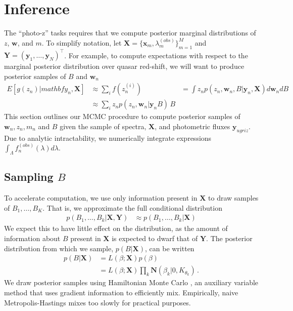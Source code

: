 \documentclass{article}
\newcommand{\trans}{\intercal}
\begin{document}
\section{Inference}
\label{sec:inference}
The ``photo-z'' tasks requires that we compute posterior marginal distributions of $z$, $\mathbf{w}$, and $m$.  To simplify notation, let $\mathbf{X} = \{\mathbf{x}_m, \lambda^{(obs)}_m \}_{m=1}^M$ and $\mathbf{Y} = ( \mathbf{y}_1, \dots, \mathbf{y}_N )^\trans$.   
For example, to compute expectations with respect to the marginal posterior distribution over quasar red-shift, we will want to produce posterior samples of $B$ and $\mathbf{w}_n$
\begin{align}
  E[ g(z_n) | mathbf{y}_n, \mathbf{X} ]
    &\approx \sum_{i} f(z_n^{(i)})
    &= \int z_n p(z_n, \mathbf{w}_n, B | \mathbf{y}_n, \mathbf{X}) d\mathbf{w}_n dB \\
    &\approx \sum_{i} z_n p(z_n, \mathbf{w}_n | \mathbf{y}_n B) \, B
\end{align}
This section outlines our MCMC procedure to compute posterior samples of $\mathbf{w}_n, z_n, m_n$ and $B$ given the sample of spectra, $\mathbf{X}$, and photometric fluxes $\mathbf{y}_{ugriz}$.  Due to analytic intractability, we numerically integrate expressions $\int_\Lambda f_n^{(obs)}(\lambda) d\lambda$. 

\subsection{Sampling $B$}
To accelerate computation, we use only information present in $\mathbf{X}$ to draw samples of $B_1, \dots, B_K$.  That is, we approximate the full conditional distribution 
\begin{align}
  p(B_1,\dots, B_k | \mathbf{X}, \mathbf{Y}) 
    &\approx p(B_1, \dots, B_k | \mathbf{X})
\end{align}
We expect this to have little effect on the distribution, as the amount of information about $B$ present in $\mathbf{X}$ is expected to dwarf that of $\mathbf{Y}$.  The posterior distribution from which we sample, $p(B | \mathbf{X})$, can be written 
\begin{align}
  p(B | \mathbf{X}) 
    &= L(\beta; \mathbf{X}) p(\beta) \\
    &= L(\beta; \mathbf{X}) \prod_{k} \mathbf{N}(\beta_k | 0, K_{\theta_k}) \, .
\end{align}
We draw posterior samples using Hamiltonian Monte Carlo \cite{neal2011mcmc}, an auxiliary variable method that uses gradient information to efficiently mix.  Empirically, naive Metropolis-Hastings mixes too slowly for practical purposes. 
\end{document}

